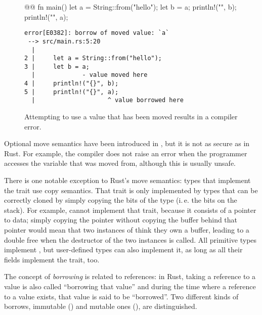 {{\begin{figure}[t]
  \centering
  \begin{minipage}[t]{.5\textwidth}
    \begin{rustcode}
      @@
      fn main() {
          let a = String::from("hello");
          let b = a;
          println!("{}", b);
          println!("{}", a);
      }
    \end{rustcode}
  \end{minipage}
  \hspace{2mm}
  \begin{minipage}[t]{.47\textwidth}
    \footnotesize
    \vspace{3mm}
    \begin{verbatim}
error[E0382]: borrow of moved value: `a`
 --> src/main.rs:5:20
  |
2 |     let a = String::from("hello");
3 |     let b = a;
  |             - value moved here
4 |     println!("{}", b);
5 |     println!("{}", a);
  |                    ^ value borrowed here
    \end{verbatim}
  \end{minipage}
  \caption{Attempting to use a value that has been moved results in a compiler error.}
  \label{fig:string-move}
\end{figure}

Optional move semantics have been introduced in \cppeleven, but it is not as secure as in Rust.
For example, the \cpp compiler does not raise an error when the programmer accesses the variable that was moved from, although this is usually unsafe.

There is one notable exception to Rust's move semantics: types that implement the trait  use copy semantics.
That trait is only implemented by types that can be correctly cloned by simply copying the bits of the type (i.\,e. the bits on the stack).
For example,  cannot implement that trait, because it consists of a pointer to data; simply copying the pointer without copying the buffer behind that pointer would mean that two instances of  think they own a buffer, leading to a double free when the destructor of the two instances is called.
All primitive types implement , but user-defined types can also implement it, as long as all their fields implement the trait, too.

\vspace{8mm}

The concept of \emph{borrowing} is related to references:
in Rust, taking a reference to a value is also called \enquote{borrowing that value} and during the time where a reference to a value exists, that value is said to be \enquote{borrowed}.
Two different kinds of borrows, immutable () and mutable ones (), are distinguished.

}}
